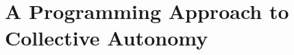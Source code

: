 




\chapter[On Collective Autonomy]{A Programming Approach to Collective Autonomy}

\minitoc%






